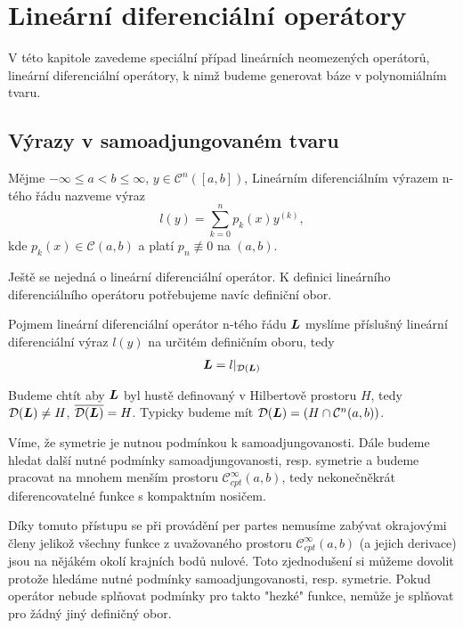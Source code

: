\section{Lineární diferenciální operátory}

V této kapitole zavedeme speciální případ lineárních neomezených operátorů, lineární diferenciální operátory, k nimž budeme generovat báze v polynomiálním tvaru.

\subsection{Výrazy v samoadjungovaném tvaru}

\begin{definition}
Mějme $-\infty \leq a < b \leq \infty$, $y \in \mathcal{C}^n ([a, b])$, 
Lineárním diferenciálním výrazem n-tého řádu nazveme výraz
\begin{equation}
    l(y) = \sum_{k=0}^{n} p_k (x) y^{(k)},
\end{equation}
kde $p_k(x) \in \mathcal{C}(a, b)$ a platí $p_n \not\equiv 0$ na $(a, b)$.
\end{definition}

\begin{remark}
    Ještě se nejedná o lineární diferenciální operátor. K definici lineárního diferenciálního operátoru potřebujeme navíc definiční obor.
\end{remark}

\begin{definition}
Pojmem lineární diferenciální operátor n-tého řádu $\boldsymbol{L}$ myslíme příslušný lineární
diferenciální výraz $l(y)$ na určitém definičním oboru, tedy
\begin{align*}
    \boldsymbol{L} = l \rvert_{\mathcal{D}(\boldsymbol{L})}
\end{align*}
\end{definition}

Budeme chtít aby $\boldsymbol{L}$ byl hustě definovaný v Hilbertově prostoru $H$, tedy $\mathcal{D}(\boldsymbol{L}) \neq H$, $\overline{\mathcal{D}(\boldsymbol{L})} = H$.
Typicky budeme mít $\mathcal{D}(\boldsymbol{L}) = \left(H \cap \mathcal{C}^n (a,b)\right)$.

Víme, že symetrie je nutnou podmínkou k samoadjungovanosti. Dále budeme hledat další
nutné podmínky samoadjungovanosti, resp. symetrie a budeme pracovat na mnohem menším prostoru $\mathcal{C}^{\infty}_{cpt} (a,b)$, tedy nekonečněkrát diferencovatelné funkce
s kompaktním nosičem.
\begin{remark}
    Díky tomuto přístupu se při provádění per partes nemusíme zabývat okrajovými členy
    jelikož všechny funkce z uvažovaného prostoru $\mathcal{C}^{\infty}_{cpt} (a,b)$ (a jejich derivace) jsou na nějákém okolí krajních bodů nulové. Toto zjednodušení si můžeme dovolit protože hledáme nutné podmínky samoadjungovanosti, resp. symetrie. Pokud operátor nebude splňovat podmínky pro takto "hezké" funkce, nemůže je splňovat pro žádný jiný definičný obor.
\end{remark}

